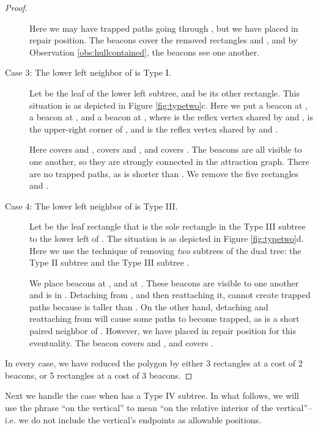 \documentclass{article}
\begin{document}
\begin{proof}
\begin{description}
				Here we may have trapped paths going through , but we have placed 
				in repair position.  The beacons cover the removed rectangles  and
				, and by Observation \ref{obs:hullcontained}, the beacons see one
				another.
			
			\item[Case 3: The lower left neighbor of  is Type I.] 
					
				Let  be the leaf of the lower left subtree, and  be its other
				rectangle.  This situation is as depicted in Figure \ref{fig:typetwo}c.
				Here we put a beacon  at , a beacon 
				at , and a beacon  at , where  is
				the reflex vertex shared by  and ,  is the upper-right corner
				of , and  is the reflex vertex shared by  and .
				
				Here  covers  and ,  covers  and , and 
				covers .  The beacons are all visible to one another, so they are
				strongly connected in the attraction graph.  There are no trapped paths, as
				 is shorter than .  We remove the five rectangles  and 
				.
				
			
			\item[Case 4: The lower left neighbor of  is Type III.] 	
			
				Let  be the leaf rectangle that is the sole rectangle in the Type III
				subtree to the lower left of .  The situation is as depicted in Figure
				\ref{fig:typetwo}d.
				Here we use the technique of removing \emph{two} subtrees of the dual tree:
				the Type II subtree  and the Type III subtree .
				
				We place beacons  at , and  at
				.  These beacons are visible to one another and
				 is in .  Detaching  from , and then reattaching it,
				cannot create trapped paths because  is taller than .
				On the other hand, detaching and reattaching  from  will cause some
				paths to become trapped, as  is a short paired neighbor of .
				However, we have placed  in repair position for this eventuality.
				The beacon  covers  and , and  covers .
			\end{description}
			
			In every case, we have reduced the polygon by either 3 rectangles at a cost
			of 2 beacons, or 5 rectangles at a cost of 3 beacons.
			
		\end{proof} 
		
		Next we handle the case when  has a Type IV subtree.  In what follows,
		we will use the phrase ``on the vertical'' to mean ``on the relative interior
		of the vertical''--i.e. we do not include the vertical's endpoints as
		allowable positions.
		
\end{document}
